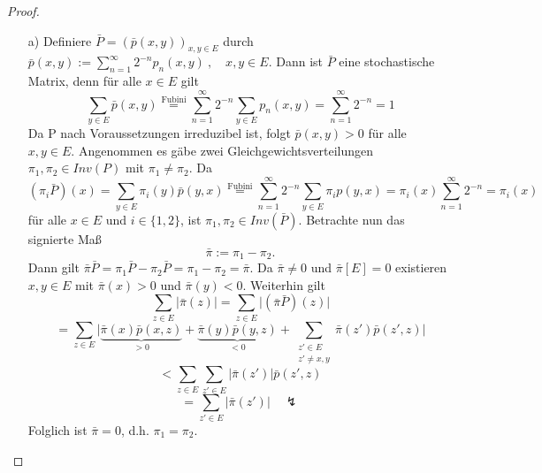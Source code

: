 \documentclass[a4paper,12pt]{scrartcl}
\theoremstyle{definition}
\begin{document}
\begin{proof}
\mbox{}
\begin{itemize}
\item[a)] Definiere $\bar{P} = (\bar{p}(x,y))_{x,y \in E}$ durch $\bar{p}(x,y) := \sum_{n=1}^{\infty} 2^{-n} p_{n}(x,y) \:, \quad x,y \in E$. Dann ist $\bar{P}$ eine stochastische Matrix, denn für alle $x \in E$ gilt
\begin{equation*}
\sum_{y \in E} \bar{p} (x,y) \stackrel{\mathrm{Fubini}}{=} \sum_{n=1}^{\infty} 2^{-n} \sum_{y \in E} p_{n}(x,y) = \sum_{n=1}^{\infty} 2^{-n} = 1
\end{equation*}
Da P nach Voraussetzungen irreduzibel ist, folgt $\bar{p}(x,y)>0$ für alle $x,y \in E$. Angenommen es gäbe zwei Gleichgewichtsverteilungen $\pi_{1},\pi_{2} \in Inv(P)$ mit $\pi_{1} \neq \pi_{2}$. Da
\begin{equation*}
(\pi_{i} \bar{P})(x) = \sum_{y \in E} \pi_{i}(y) \bar{p}(y,x) \stackrel{\mathrm{Fubini}}{=} \sum_{n=1}^{\infty} 2^{-n} \sum_{y \in E} \pi_{i} p(y,x) = \pi_{i}(x) \sum_{n=1}^{\infty} 2^{-n} = \pi_{i}(x)
\end{equation*} 
für alle $x \in E$ und $i \in \lbrace 1,2 \rbrace$, ist $\pi_{1}, \pi_{2} \in Inv(\bar{P})$. Betrachte nun das signierte Maß
\begin{equation*}
\bar{\pi} := \pi_{1} - \pi_{2}.
\end{equation*}
Dann gilt $\bar{\pi} \bar{P} = \pi_{1} \bar{P} - \pi_{2} \bar{P} = \pi_{1} - \pi_{2} = \bar{\pi}$. Da $\bar{\pi} \neq 0$ und $\bar{\pi}[E]=0$ existieren $x,y \in E$ mit $\bar{\pi}(x) > 0$ und $\bar{\pi}(y) < 0$. Weiterhin gilt
\begin{equation*}
\sum_{z \in E} \vert \bar{\pi}(z) \vert = \sum_{z \in E} \vert (\bar{\pi}\bar{P})(z) \vert
\end{equation*}
\begin{equation*}
= \sum_{z \in E}\vert \underbrace{\bar{\pi}(x)\bar{p}(x,z)}_{>0} + \underbrace{\bar{\pi}(y)\bar{p}(y,z)}_{<0} +  \sum_{\substack{ z' \in E \\ z' \neq x,y } }\bar{\pi}(z')\bar{p}(z',z) \vert
\end{equation*}
\begin{equation*}
< \sum_{z \in E} \sum_{z' \in E} \vert \bar{\pi}(z') \vert \bar{p}(z',z)
\end{equation*}
\begin{equation*}
= \sum_{z' \in E} \vert \bar{\pi}(z') \vert \quad \lightning
\end{equation*}
Folglich ist $\bar{\pi}=0$, d.h. $\pi_{1} = \pi_{2}$.

\end{itemize}
\end{proof}
\end{document}
